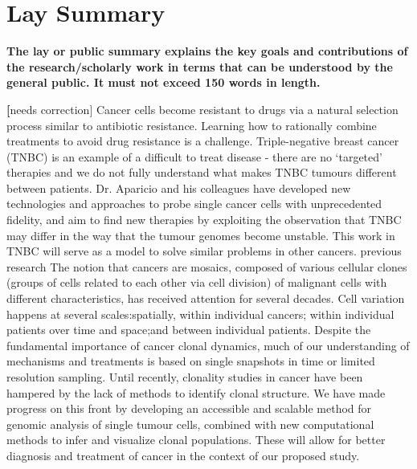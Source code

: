 

 \chapter{Lay Summary}

\textbf{The lay or public summary explains the key goals and contributions of
the research\slash{}scholarly work in terms that can be understood by the
general public. It must not exceed 150 words in length.}

\textbf[{needs correction}] Cancer cells become resistant to drugs via a natural selection process similar to antibiotic resistance. Learning
how to rationally combine treatments to avoid drug resistance is a challenge. Triple-negative breast cancer
(TNBC) is an example of a difficult to treat disease - there are no `targeted' therapies and we do not fully
understand what makes TNBC tumours different between patients. Dr. Aparicio and his colleagues have
developed new technologies and approaches to probe single cancer cells with unprecedented fidelity, and aim to
find new therapies by exploiting the observation that TNBC may differ in the way that the tumour genomes become unstable. This work in TNBC will serve as a model to solve similar problems in other cancers.
previous research
The notion that cancers are mosaics, composed of various cellular clones (groups of cells related to each other
via cell division) of malignant cells with different characteristics, has received attention for several decades. Cell
variation happens at several scales:spatially, within individual cancers; within individual patients over time and
space;and between individual patients. Despite the fundamental importance of cancer clonal dynamics, much of
our understanding of mechanisms and treatments is based on single snapshots in time or limited resolution
sampling. Until recently, clonality studies in cancer have been hampered by the lack of methods to identify clonal
structure. We have made progress on this front by developing an accessible and scalable method for genomic
analysis of single tumour cells, combined with new computational methods to infer and visualize clonal
populations. These will allow for better diagnosis and treatment of cancer in the context of our proposed study.

